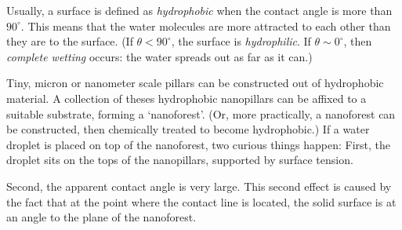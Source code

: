\documentclass[a4paper]{report}
\begin{document}
Usually, a surface is defined as \emph{hydrophobic} when the contact angle is more than $90^{\circ}$.  This means that the water molecules are more attracted to each other than they are to the surface. (If $\theta < 90^{\circ}$, the surface is \emph{hydrophilic}.  If $\theta \sim 0^{\circ}$, then \emph{complete wetting} occurs: the water spreads out as far as it can.)

Tiny, micron or nanometer scale pillars can be constructed out of hydrophobic material.  A collection of theses hydrophobic nanopillars can be affixed to a suitable substrate, forming a `nanoforest'.  (Or, more practically, a nanoforest can be constructed, then chemically treated to become hydrophobic.)  If a water droplet is placed on top of the nanoforest, two curious things happen:  First, the droplet sits on the tops of the nanopillars, supported by surface tension.

\begin{center}
\end{center}

Second, the apparent contact angle is very large.  This second effect is caused by the fact that at the point where the contact line is located, the solid surface is at an angle to the plane of the nanoforest.

\begin{center}
\end{center}
\end{document}
